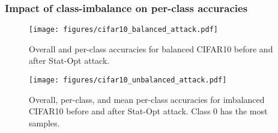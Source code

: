 \subsubsection{Impact of class-imbalance on per-class accuracies}\label{impact:evaluation:imbalance}

\begin{figure}
\centering
\texttt{[image: figures/cifar10\_balanced\_attack.pdf]}
\vspace*{-0.3cm}
\caption{Overall and per-class accuracies for balanced CIFAR10 before and after Stat-Opt attack.}
\label{fig:balanced_cifar}
\vspace*{-0.5cm}
\end{figure}

\begin{figure}
\centering
\texttt{[image: figures/cifar10\_unbalanced\_attack.pdf]}
\caption{Overall, per-class, and mean per-class accuracies for imbalanced CIFAR10 before and after Stat-Opt attack. Class 0 has the most samples.}
\label{fig:imbalanced_cifar}
\end{figure}

